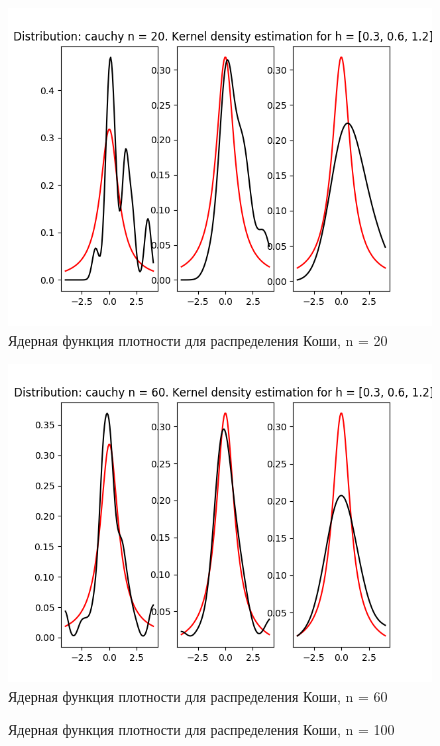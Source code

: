 \documentclass[12pt]{article}
\begin{document}
\begin{center}
    \begin{figure}[H]
 \caption{Ядерная функция плотности для распределения Коши, n = 20}
\includegraphics[width=\textwidth]{kernel/d_cauchy20.png}
\end{figure}
    \begin{figure}[H]
 \caption{Ядерная функция плотности для распределения Коши, n = 60}
\includegraphics[width=\textwidth]{kernel/d_cauchy60.png}
\end{figure}
    \begin{figure}[H]
 \caption{Ядерная функция плотности для распределения Коши, n = 100}

\end{figure}
\end{center}
\end{document}
